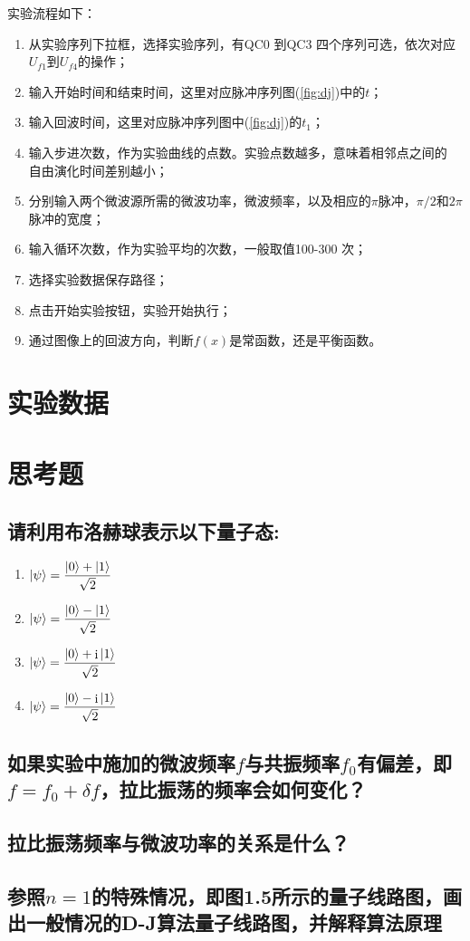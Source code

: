 \documentclass[a4paper]{article}
\DeclareMathOperator{\I}{\mathrm{i}}
\begin{document}
实验流程如下：
\begin{enumerate}
	\item 从实验序列下拉框，选择实验序列，有QC0 到QC3 四个序列可选，依次对应
	$ U_{f 1 } $到$ U_{f 4 } $的操作；
	\item 输入开始时间和结束时间，这里对应脉冲序列图(\ref{fig:dj})中的$ t $；
	\item 输入回波时间，这里对应脉冲序列图中(\ref{fig:dj})的$ t_1 $；
	\item 输入步进次数，作为实验曲线的点数。实验点数越多，意味着相邻点之间的
	自由演化时间差别越小；
	\item 分别输入两个微波源所需的微波功率，微波频率，以及相应的$ \pi $脉冲，$ \pi/2 $和$ 	2\pi  $脉冲的宽度；
	\item 输入循环次数，作为实验平均的次数，一般取值100-300 次；
	\item 选择实验数据保存路径；
	\item 点击开始实验按钮，实验开始执行；
	\item 通过图像上的回波方向，判断$ f (x)  $是常函数，还是平衡函数。
\end{enumerate}





\section{实验数据}


\section{思考题}
\subsection*{请利用布洛赫球表示以下量子态:}
\begin{enumerate}
	\item $ \ket{\psi} = \dfrac{\ket{0} + \ket{1}}{\sqrt{2}} $
	\item $ \ket{\psi} = \dfrac{\ket{0} - \ket{1}}{\sqrt{2}} $
	\item $ \ket{\psi} = \dfrac{\ket{0} + \I\ket{1}}{\sqrt{2}} $
	\item $ \ket{\psi} = \dfrac{\ket{0} - \I\ket{1}}{\sqrt{2}} $
\end{enumerate}


\subsection*{如果实验中施加的微波频率$ f $与共振频率$ f_0 $有偏差，即$ f = f_0 + \delta f $，拉比振荡的频率会如何变化？}

\subsection*{拉比振荡频率与微波功率的关系是什么？}

\subsection*{参照$ n=1 $的特殊情况，即图1.5所示的量子线路图，画出一般情况的D-J算法量子线路图，并解释算法原理}



\end{document}

